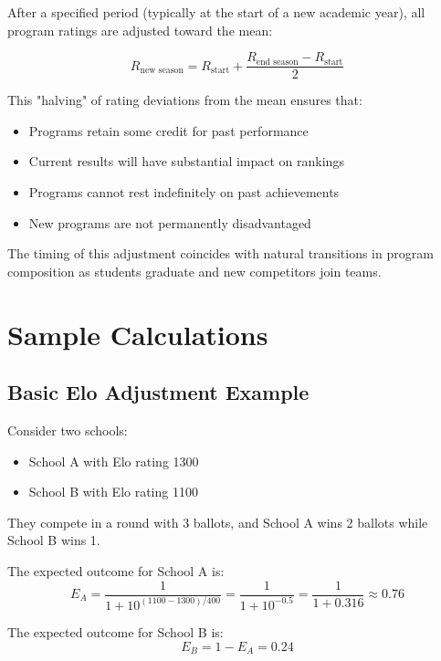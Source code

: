\documentclass[11pt]{article}
\begin{document}
After a specified period (typically at the start of a new academic year), all program ratings are adjusted toward the mean:

\begin{equation}
R_{\text{new season}} = R_{\text{start}} + \frac{R_{\text{end season}} - R_{\text{start}}}{2}
\end{equation}

This "halving" of rating deviations from the mean ensures that:
\begin{itemize}
    \item Programs retain some credit for past performance
    \item Current results will have substantial impact on rankings
    \item Programs cannot rest indefinitely on past achievements
    \item New programs are not permanently disadvantaged
\end{itemize}

The timing of this adjustment coincides with natural transitions in program composition as students graduate and new competitors join teams.

\section{Sample Calculations}

\subsection{Basic Elo Adjustment Example}

Consider two schools:
\begin{itemize}
    \item School A with Elo rating 1300
    \item School B with Elo rating 1100
\end{itemize}

They compete in a round with 3 ballots, and School A wins 2 ballots while School B wins 1.

The expected outcome for School A is:
\begin{equation}
E_A = \frac{1}{1 + 10^{(1100 - 1300)/400}} = \frac{1}{1 + 10^{-0.5}} = \frac{1}{1 + 0.316} \approx 0.76
\end{equation}

The expected outcome for School B is:
\begin{equation}
E_B = 1 - E_A = 0.24
\end{equation}
\end{document}
